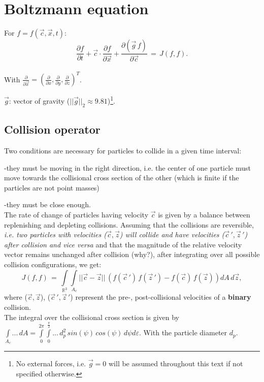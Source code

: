 \section{Boltzmann equation}

For $f=f(\vec c, \vec x, t)$:
\begin{equation}
 \frac{\partial{f}}{\partial{t}} + \vec c \cdot  \frac{\partial{f}}{\partial{\vec x}} + \frac{\partial{(\vec g \, f)}}{\partial{\vec c}} \, = \, J(f, f).\label{BE}
\end{equation}\\[2ex]
With $\frac{\partial{}}{\partial{\vec x}} = \left( \frac{\partial{}}{\partial{x}}, \frac{\partial{}}{\partial{y}}, \frac{\partial{}}{\partial{z}} \right)^T$.\par
$\vec g$: vector of gravity ($||\vec g||_2 \approx 9.81$)\footnote{No external forces, i.e. $\vec g =0$ will be assumed throughout this text if not specified otherwise.}.

\subsection{Collision operator}

Two conditions are necessary for particles to collide in a given time interval:\par
-they must be moving in the right direction, i.e. the center of one particle must move towards the collisional cross section of the other (which is finite if the particles are not point masses)\par
-they must be close enough.\\[1ex]
The rate of change of particles having velocity $\vec c$ is given by a balance between replenishing and depleting collisions. Assuming that the collisions are reversible, \textit{i.e. two particles with velocities ($\vec c, \vec z$) will collide and have velocities ($\vec c \, ', \vec z \, '$) after collision and vice versa} and that the magnitude of the relative velocity vector remains unchanged after collision (why?), after integrating over all possible collision configurations, we get:
\begin{equation}
 J(f, f)\, = \, \int \limits_{\mathbb{R}^3} \int \limits_{A_c} ||\vec c - \vec z|| \, \left( f(\vec c\, ') \, f(\vec z\, ') - f(\vec c) \, f(\vec z) \right) dA \, d\vec z,\label{CO}
\end{equation}
where ($\vec c, \vec z$), ($\vec c \, ', \vec z \, '$) represent the pre-, post-collisional velocities of a \textbf{binary} collision.\\[1ex]
The integral over the collisional cross section is given by $ \int \limits_{A_c} ... \, dA = \int \limits_{0}^{2 \pi} \int \limits_{0}^{\frac{\pi}{2}}... \,d_p^2 \, sin(\psi) \, cos(\psi) \, d\psi d\varepsilon$. With the particle diameter $d_p$.


